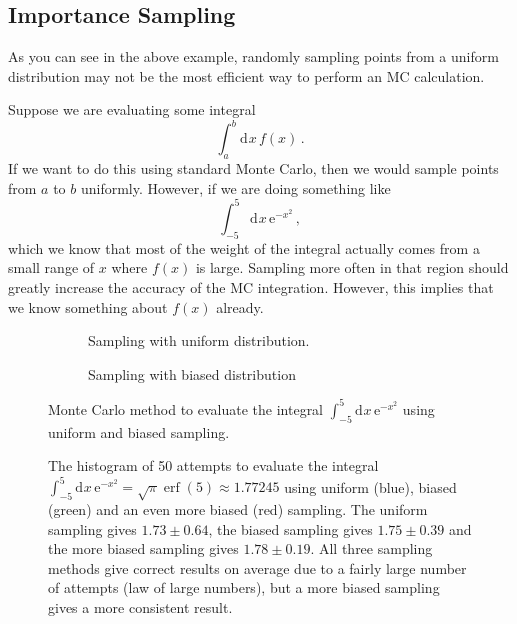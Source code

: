 \documentclass{article}
\theoremstyle{plain}\theoremheaderfont{\normalfont\itshape}\theorembodyfont{\rmfamily}\theoremseparator{.}\newtheorem*{rem}{Remark}\newtheorem*{ex}{Example}\newtheorem*{proof}{Proof}\newtheorem*{altp}{Alternative proof}
\theoremstyle{plain}\theoremheaderfont{\normalfont\bfseries}\theorembodyfont{\rmfamily}\theoremseparator{.}\newtheorem{thm}{Theorem}[section]\newtheorem{lem}[thm]{Lemma}\newtheorem{prop}[thm]{Proposition}\newtheorem*{cor}{Corollary}\newtheorem{defn}[thm]{Definition}\newtheorem{clm}[thm]{Claim}\newtheorem{clminproof}{Claim}\newtheorem{alg}[thm]{Algorithm}\newtheorem{hyp}[thm]{Hypothesis}\newtheorem{law}[thm]{Law}
\theoremstyle{break}\theoremheaderfont{\normalfont\itshape}\theorembodyfont{\rmfamily}\theoremseparator{.\medskip}\newtheorem*{proofskip}{Proof}\newtheorem*{exs}{Examples}\newtheorem*{rems}{Remarks}
\theoremstyle{break}\theoremheaderfont{\normalfont\bfseries}\theorembodyfont{\rmfamily}\theoremseparator{.\medskip}\newtheorem{lemskip}[thm]{Lemma}\newtheorem{defnskip}[thm]{Definition}\newtheorem{propskip}[thm]{Proposition}\newtheorem{thmskip}[thm]{Theorem}
\numberwithin{equation}{section}
\newcommand{\ee}{\mathrm{e}}
\newcommand{\dd}[2][]{\mathrm{d}^{#1} #2\,}
\DeclareMathOperator{\erf}{erf}
\begin{document}
    \subsection{Importance Sampling}
    As you can see in the above example, randomly sampling points from a uniform distribution may not be the most efficient way to perform an MC calculation.

    Suppose we are evaluating some integral
    \begin{equation}
        \int_{a}^{b}\dd{x}f(x)\,.
    \end{equation}
    If we want to do this using standard Monte Carlo, then we would sample points from \(a\) to \(b\) uniformly. However, if we are doing something like
    \begin{equation}
        \int_{-5}^{5}\dd{x}\ee^{-x^2}\,,
    \end{equation}
    which we know that most of the weight of the integral actually comes from a small range of \(x\) where \(f(x)\) is large. Sampling more often in that region should greatly increase the accuracy of the MC integration. However, this implies that we know something about \(f(x)\) already.

    \begin{figure}[ht!]
        \begin{subfigure}[h]{0.48\linewidth}
            \begin{adjustbox}{width=\linewidth}
            
            \end{adjustbox}
            \caption{Sampling with uniform distribution.}
        \end{subfigure}
        \hfill
        \begin{subfigure}[h]{0.48\linewidth}
            \begin{adjustbox}{width=\linewidth}
            
            \end{adjustbox}
            \caption{Sampling with biased distribution}
        \end{subfigure}%
        \caption{Monte Carlo method to evaluate the integral \(\int_{-5}^{5}\dd{x}\ee^{-x^2}\) using uniform and biased sampling.}
    \end{figure}
    \begin{figure}[ht!]
        \centering
        
        \caption{The histogram of 50 attempts to evaluate the integral \(\int_{-5}^{5}\dd{x}\ee^{-x^2}=\sqrt{\pi}\erf(5)\approx 1.77245\) using uniform (blue), biased (green) and an even more biased (red) sampling. The uniform sampling gives \(1.73\pm 0.64\), the biased sampling gives \(1.75\pm 0.39\) and the more biased sampling gives \(1.78\pm 0.19\). All three sampling methods give correct results on average due to a fairly large number of attempts (law of large numbers), but a more biased sampling gives a more consistent result.}
    \end{figure}
\end{document}
